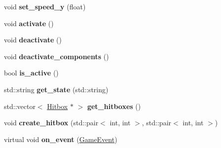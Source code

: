 \begin{DoxyCompactItemize}
\item 
void {\bfseries set\+\_\+speed\+\_\+y} (float)\hypertarget{classengine_1_1_game_object_a62ba05459de448237e6de79eb9cb1557}{}\label{classengine_1_1_game_object_a62ba05459de448237e6de79eb9cb1557}

\item 
void {\bfseries activate} ()\hypertarget{classengine_1_1_game_object_a1b0eacb99cbbb27e87e12ec54d36a9d7}{}\label{classengine_1_1_game_object_a1b0eacb99cbbb27e87e12ec54d36a9d7}

\item 
void {\bfseries deactivate} ()\hypertarget{classengine_1_1_game_object_a07959eddddd69a9eee5e1dd3842c193c}{}\label{classengine_1_1_game_object_a07959eddddd69a9eee5e1dd3842c193c}

\item 
void {\bfseries deactivate\+\_\+components} ()\hypertarget{classengine_1_1_game_object_a53ecb7384b8fcfe8b0d887603070d8b1}{}\label{classengine_1_1_game_object_a53ecb7384b8fcfe8b0d887603070d8b1}

\item 
bool {\bfseries is\+\_\+active} ()\hypertarget{classengine_1_1_game_object_aac0171415e6af36c39c61288a704c613}{}\label{classengine_1_1_game_object_aac0171415e6af36c39c61288a704c613}

\item 
std\+::string {\bfseries get\+\_\+state} (std\+::string)\hypertarget{classengine_1_1_game_object_acd2c3f8e4ef6a0116108fbb59e9241f1}{}\label{classengine_1_1_game_object_acd2c3f8e4ef6a0116108fbb59e9241f1}

\item 
std\+::vector$<$ \hyperlink{classengine_1_1_hitbox}{Hitbox} $\ast$ $>$ {\bfseries get\+\_\+hitboxes} ()\hypertarget{classengine_1_1_game_object_aea5d44c3ed89d21e808a95287a933612}{}\label{classengine_1_1_game_object_aea5d44c3ed89d21e808a95287a933612}

\item 
void {\bfseries create\+\_\+hitbox} (std\+::pair$<$ int, int $>$, std\+::pair$<$ int, int $>$)\hypertarget{classengine_1_1_game_object_a6c1e7f2de3b512452a44fc908dc03f33}{}\label{classengine_1_1_game_object_a6c1e7f2de3b512452a44fc908dc03f33}

\item 
virtual void {\bfseries on\+\_\+event} (\hyperlink{class_game_event}{Game\+Event})\hypertarget{classengine_1_1_game_object_a01a503c00127facdd2416b93475cb275}{}\label{classengine_1_1_game_object_a01a503c00127facdd2416b93475cb275}


\end{DoxyCompactItemize}
